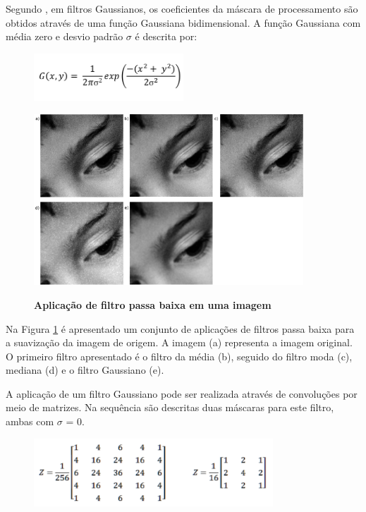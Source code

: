 \documentclass[
	12pt,				%
	oneside,			%
	a4paper,			%
	english,			%
	french,				%
	spanish,			%
	brazil,				%
	]{abntex2}
\begin{document}
Segundo \citet{pedriniSchwartz:2008}, em filtros Gaussianos, os coeficientes da máscara de processamento são obtidos através de uma função Gaussiana bidimensional. A função Gaussiana com média zero e desvio padrão \(\sigma\) é descrita por:

\begin{figure}[ht]
\centering
\includegraphics[width=0.5\textwidth]{imagens/gauss_formula.png}
\end{figure}

\begin{figure}[h]
\centering
\caption{\textbf{Aplicação de filtro passa baixa em uma imagem}}
\includegraphics[width=0.9\textwidth]{imagens/suavizacao.png}
\sourceAuthor
\label{fig:suavizacao}
\end{figure}

Na Figura \ref{fig:suavizacao} é apresentado um conjunto de aplicações de filtros passa baixa para a suavização da imagem de origem. A imagem (a) representa a imagem original.  O primeiro filtro apresentado é o filtro da média (b), seguido do filtro moda (c), mediana (d) e o filtro Gaussiano (e).

A aplicação de um filtro Gaussiano pode ser realizada através de convoluções por meio de matrizes. Na sequência são descritas duas máscaras para este filtro, ambas com \(\sigma\) = 0.

\begin{figure}[ht]
\centering
\includegraphics[width=0.8\textwidth]{imagens/gauss_mascara.png}
\end{figure}
\end{document}
